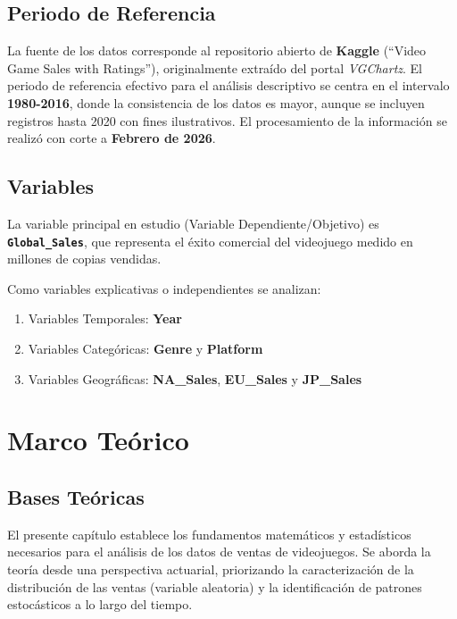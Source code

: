 \documentclass[oneside,11pt]{Latex/Classes/PhDthesisPSnPDF}
\begin{document}
\section{Periodo de Referencia}

La fuente de los datos corresponde al repositorio abierto de
\textbf{Kaggle} (``Video Game Sales with Ratings''), originalmente
extraído del portal \emph{VGChartz}. El periodo de referencia efectivo
para el análisis descriptivo se centra en el intervalo
\textbf{1980-2016}, donde la consistencia de los datos es mayor, aunque
se incluyen registros hasta 2020 con fines ilustrativos. El
procesamiento de la información se realizó con corte a \textbf{Febrero
de 2026}.

\section{Variables}

La variable principal en estudio (Variable Dependiente/Objetivo) es
\textbf{\texttt{Global\_Sales}}, que representa el éxito comercial del
videojuego medido en millones de copias vendidas.

Como variables explicativas o independientes se analizan:

\begin{enumerate}
  \item Variables Temporales: \textbf{Year}
  \item Variables Categóricas: \textbf{Genre} y \textbf{Platform}
  \item Variables Geográficas: \textbf{NA\_Sales}, \textbf{EU\_Sales} y \textbf{JP\_Sales}
\end{enumerate}

\chapter{Marco Teórico}

\section{Bases Teóricas}

El presente capítulo establece los fundamentos matemáticos y
estadísticos necesarios para el análisis de los datos de ventas de
videojuegos. Se aborda la teoría desde una perspectiva actuarial,
priorizando la caracterización de la distribución de las ventas
(variable aleatoria) y la identificación de patrones estocásticos a lo
largo del tiempo.
\end{document}

